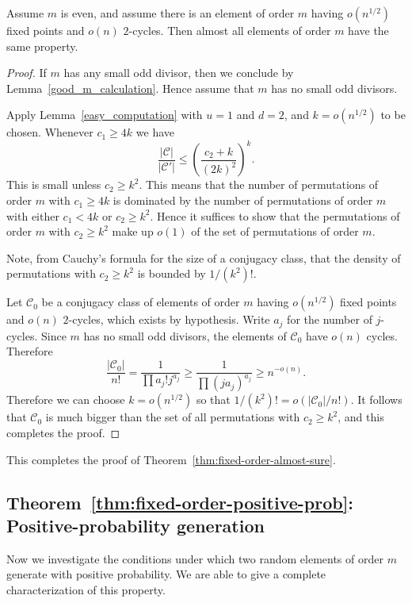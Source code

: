 \documentclass[ALCO,ThmDefs,Unicode,epreuves]{cedram}
\newcommand\calC{\mathcal{C}}
\begin{document}
\begin{lemma}\label{good_m_calculation_2}
Assume $m$ is even, and assume there is an element of order $m$ having $o(n^{1/2})$ fixed points and $o(n)$ $2$-cycles. Then almost all elements of order $m$ have the same property.
\end{lemma}
\begin{proof}
If $m$ has any small odd divisor, then we conclude by Lemma~\ref{good_m_calculation}. Hence assume that $m$ has no small odd divisors.

Apply Lemma~\ref{easy_computation} with $u=1$ and $d=2$, and $k = o(n^{1/2})$ to be chosen.
Whenever $c_1 \geq 4k$ we have
\[
 \frac{|\calC|}{|\calC '|} \leq \left(\frac{c_2+k}{(2k)^2}\right)^k.
\]
This is small unless $c_2 \geq k^2$. This means that the number of permutations of order $m$ with $c_1 \geq 4k$ is dominated by the number of permutations of order $m$ with either $c_1 < 4k$ or $c_2 \geq k^2$.
Hence it suffices to show that the permutations of order $m$ with $c_2 \geq k^2$ make up $o(1)$ of the set of permutations of order $m$.

Note, from Cauchy's formula for the size of a conjugacy class, that the density of permutations with $c_2 \geq k^2$ is bounded by $1/(k^2)!$.

Let $\calC_0$ be a conjugacy class of elements of order $m$ having $o(n^{1/2})$ fixed points and $o(n)$ $2$-cycles, which exists by hypothesis.
Write $a_j$ for the number of $j$-cycles. Since $m$ has no small odd divisors, the elements of $\calC_0$ have $o(n)$ cycles. Therefore
\[
 \frac{|\calC_0|}{n!} = \frac{1}{\prod a_j! j^{a_j}} \geq \frac{1}{\prod (j a_j )^{a_j}} \geq n^{-o(n)}.
\]
Therefore we can choose $k = o(n^{1/2})$ so that $1/(k^2)! = o(|\calC_0|/n!)$.
It follows that $\calC_0$ is much bigger than the set of all permutations with $c_2 \geq k^2$, and this completes the proof.
\end{proof}

This completes the proof of Theorem~\ref{thm:fixed-order-almost-sure}.

\subsection{Theorem~\ref{thm:fixed-order-positive-prob}: Positive-probability generation} Now we investigate the conditions under which two random elements of order $m$ generate with positive probability. We are able to give a complete characterization of this property.
\end{document}

